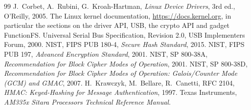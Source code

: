 \begin{thebibliography}{99}
 J.~Corbet, A.~Rubini, G.~Kroah-Hartman, \emph{Linux Device Drivers}, 3rd ed., O'Reilly, 2005.
 The Linux kernel documentation, \url{https://docs.kernel.org}, in particular the sections on the driver API, USB, the crypto API and gadget FunctionFS.
 Universal Serial Bus Specification, Revision 2.0, USB Implementers Forum, 2000.
 NIST, FIPS PUB 180-4, \emph{Secure Hash Standard}, 2015.
 NIST, FIPS PUB 197, \emph{Advanced Encryption Standard}, 2001.
 NIST, SP 800-38A, \emph{Recommendation for Block Cipher Modes of Operation}, 2001.
 NIST, SP 800-38D, \emph{Recommendation for Block Cipher Modes of Operation: Galois/Counter Mode (GCM) and GMAC}, 2007.
 H.~Krawczyk, M.~Bellare, R.~Canetti, RFC 2104, \emph{HMAC: Keyed-Hashing for Message Authentication}, 1997.
 Texas Instruments, \emph{AM335x Sitara Processors Technical Reference Manual}.
\end{thebibliography}
